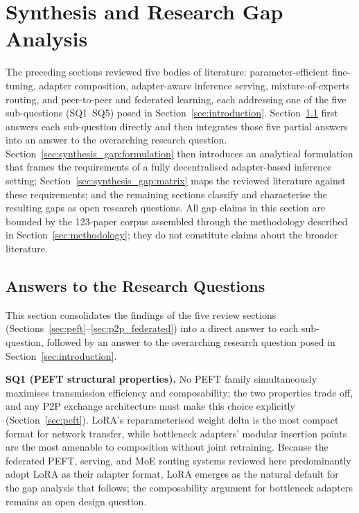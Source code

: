 \section{Synthesis and Research Gap Analysis}
\label{sec:synthesis_gap}

The preceding sections reviewed five bodies of literature: parameter-efficient
fine-tuning, adapter composition, adapter-aware inference serving,
mixture-of-experts routing, and peer-to-peer and federated learning, each
addressing one of the five sub-questions (SQ1--SQ5) posed in
Section~\ref{sec:introduction}. Section~\ref{sec:synthesis_gap:answers} first
answers each sub-question directly and then integrates those five partial
answers into an answer to the overarching research question.
Section~\ref{sec:synthesis_gap:formulation} then introduces an analytical
formulation that frames the requirements of a fully decentralised
adapter-based inference setting; Section~\ref{sec:synthesis_gap:matrix} maps
the reviewed literature against these requirements; and the remaining sections
classify and characterise the resulting gaps as open research questions. All
gap claims in this section are bounded by the 123-paper corpus assembled
through the methodology described in Section~\ref{sec:methodology}; they do not
constitute claims about the broader literature.

\subsection{Answers to the Research Questions}
\label{sec:synthesis_gap:answers}

This section consolidates the findings of the five review sections
(Sections~\ref{sec:peft}--\ref{sec:p2p_federated}) into a direct answer to each
sub-question, followed by an answer to the overarching research question posed
in Section~\ref{sec:introduction}.

\noindent\textbf{SQ1 (PEFT structural properties).} No PEFT family simultaneously
maximises transmission efficiency and composability; the two properties trade
off, and any P2P exchange architecture must make this choice explicitly
(Section~\ref{sec:peft}). LoRA's reparameterised weight delta
\cite{Hu2022} is the most compact format for network transfer, while bottleneck
adapters' modular insertion points \cite{Houlsby2019} are the most amenable to
composition without joint retraining. Because the federated PEFT, serving, and
MoE routing systems reviewed here predominantly adopt LoRA as their adapter
format, LoRA emerges as the natural default for the gap analysis that follows;
the composability argument for bottleneck adapters remains an open design
question.

